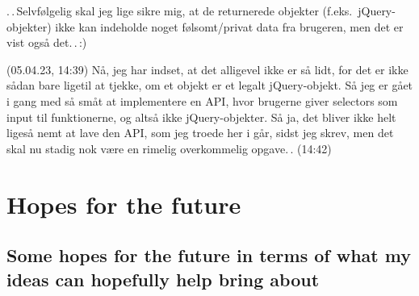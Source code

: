 \documentclass{report}
\begin{document}
.\,.\,Selvfølgelig skal jeg lige sikre mig, at de returnerede objekter (f.eks.\ jQuery-objekter) ikke kan indeholde noget følsomt/privat data fra brugeren, men det er vist også det.\,.\,:) 


(05.04.23, 14:39) Nå, jeg har indset, at det alligevel ikke er så lidt, for det er ikke sådan bare ligetil at tjekke, om et objekt er et legalt jQuery-objekt. Så jeg er gået i gang med så småt at implementere en API, hvor brugerne giver selectors som input til funktionerne, og altså ikke jQuery-objekter. Så ja, det bliver ikke helt ligeså nemt at lave den API, som jeg troede her i går, sidst jeg skrev, men det skal nu stadig nok være en rimelig overkommelig opgave.\,. (14:42)








































\chapter{Hopes for the future}

\section{Some hopes for the future in terms of what my ideas can hopefully help bring about}
\label{Some_hopes_in_terms_of_my_ideas}
\end{document}

